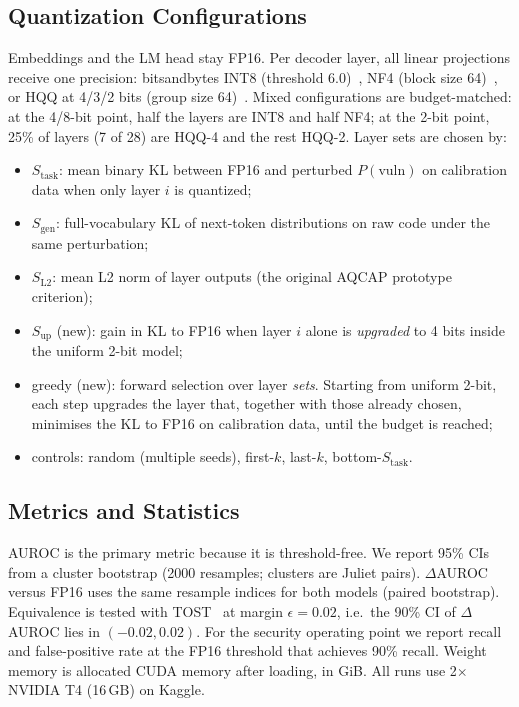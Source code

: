 \documentclass[conference]{IEEEtran}
\newcommand{\stask}{S_{\text{task}}}
\newcommand{\sgen}{S_{\text{gen}}}
\newcommand{\slt}{S_{\text{L2}}}
\newcommand{\sUp}{S_{\text{up}}}
\begin{document}
\subsection{Quantization Configurations}
Embeddings and the LM head stay FP16. Per decoder layer, all linear projections receive one precision: bitsandbytes INT8 (threshold 6.0)~\cite{dettmers2022llmint8}, NF4 (block size 64)~\cite{dettmers2023qlora}, or HQQ at 4/3/2 bits (group size 64)~\cite{badri2023hqq}. Mixed configurations are budget-matched: at the 4/8-bit point, half the layers are INT8 and half NF4; at the 2-bit point, 25\% of layers (7 of 28) are HQQ-4 and the rest HQQ-2. Layer sets are chosen by:
\begin{itemize}
  \item $\stask$: mean binary KL between FP16 and perturbed $P(\text{vuln})$ on calibration data when only layer $i$ is quantized;
  \item $\sgen$: full-vocabulary KL of next-token distributions on raw code under the same perturbation;
  \item $\slt$: mean L2 norm of layer outputs (the original AQCAP prototype criterion);
  \item $\sUp$ (new): gain in KL to FP16 when layer $i$ alone is \emph{upgraded} to 4 bits inside the uniform 2-bit model;
  \item greedy (new): forward selection over layer \emph{sets}. Starting from uniform 2-bit, each step upgrades the layer that, together with those already chosen, minimises the KL to FP16 on calibration data, until the budget is reached;
  \item controls: random (multiple seeds), first-$k$, last-$k$, bottom-$\stask$.
\end{itemize}

\subsection{Metrics and Statistics}
AUROC is the primary metric because it is threshold-free. We report 95\% CIs from a cluster bootstrap (2000 resamples; clusters are Juliet pairs). $\Delta$AUROC versus FP16 uses the same resample indices for both models (paired bootstrap). Equivalence is tested with TOST~\cite{schuirmann1987tost} at margin $\epsilon=0.02$, i.e.\ the 90\% CI of $\Delta$AUROC lies in $(-0.02, 0.02)$. For the security operating point we report recall and false-positive rate at the FP16 threshold that achieves 90\% recall. Weight memory is allocated CUDA memory after loading, in GiB. All runs use 2$\times$ NVIDIA T4 (16\,GB) on Kaggle.
\end{document}
